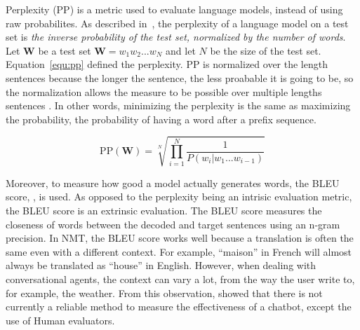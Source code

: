 Perplexity (PP) is a metric used to evaluate language models, instead of using raw probabilites. As described in~\citet{jurafsky2014speech}, the perplexity of a language model on a test set is \textit{the inverse probability of the test set, normalized by the number of words}. Let $\mathbf{W}$ be a test set $\mathbf{W}=w_1 w_2 ... w_N$ and let $N$ be the size of the test set. Equation~\ref{equ:pp} defined the perplexity.
PP is normalized over the length sentences because the longer the sentence, the less proabable it is going to be, so the normalization allows the measure to be possible over multiple lengths sentences \citep{nlp-jurasky-4.4}.
In other words, minimizing the perplexity is the same as maximizing the probability, the probability of having a word after a prefix sequence.

\begin{equation}
    \mathrm{PP}(\mathbf{W}) = \sqrt[N]{ \prod_{i=1}^N \frac{1}{P(w_i | w_1 ... w_{i-1})}  }
    \label{equ:pp}
\end{equation}

Moreover, to measure how good a model actually generates words, the BLEU score, \citet{bleu-score}, is used. As opposed to the perplexity being an intrisic evaluation metric, the BLEU score is an extrinsic evaluation. The BLEU score measures the closeness of words between the decoded and target sentences using an n-gram precision.
In NMT, the BLEU score works well because a translation is often the same even with a different context. For example, ``maison'' in French will almost always be translated as ``house'' in English.
However, when dealing with conversational agents, the context can vary a lot, from the way the user write to, for example, the weather. From this observation, \citet{1603.08023} showed that there is not currently a reliable method to measure the effectiveness of a chatbot, except the use of Human evaluators.

